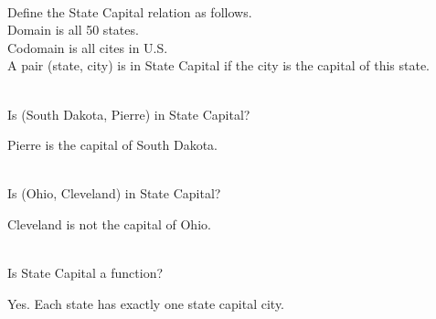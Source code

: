 \documentclass{ximera}
\begin{document}
\quad \\





\begin{question}

Define the State Capital relation as follows. \\
Domain is all 50 states. \\ 
Codomain is all cites in U.S. \\
A pair (state, city) is in State Capital if the city is the capital of this state.

\quad \\
Is (South Dakota, Pierre) in State Capital?
\begin{multipleChoice}
\end{multipleChoice}
\begin{feedback}
Pierre is the capital of South Dakota.
\end{feedback}

\quad \\
Is (Ohio, Cleveland) in State Capital?
\begin{multipleChoice}
\end{multipleChoice}
\begin{feedback}
Cleveland is not the capital of Ohio.
\end{feedback}

\quad \\
Is State Capital a function?
\begin{multipleChoice}
\end{multipleChoice}
\begin{feedback}
Yes. Each state has exactly one state capital city.
\end{feedback}

\end{question}



\quad \\
\end{document}
